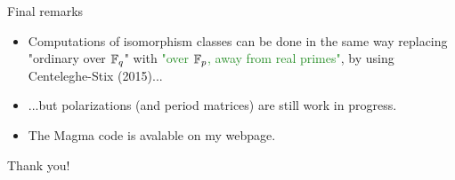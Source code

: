 \documentclass[usenames,dvipsnames]{beamer}
\newcommand{\green}[1]{\textcolor{ForestGreen}{#1}}
\begin{document}
\begin{frame}{ Final remarks }
    \begin{itemize}
     \item Computations of isomorphism classes can be done in the same way replacing "ordinary over $\mathbb{F}_q$" with \green{"over $\mathbb{F}_p$, away from real primes"}, by using Centeleghe-Stix (2015)...
     \item ...but polarizations (and period matrices) are still work in progress.
     \item The Magma code is avalable on my webpage.
    \end{itemize}
\end{frame}

\begin{frame}{ }
\begin{center}
{\Large Thank you!}
\end{center}
\end{frame}
\end{document}
